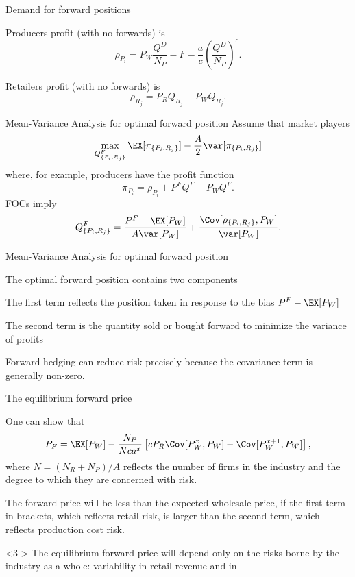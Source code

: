 {Demand for forward positions}






	Producers profit (with no forwards) is
$$
\rho_{P_i}=P_W\frac{Q^D}{N_P}-F-\frac{a}{c}\left(\frac{Q^D}{N_P}\right)^{c}.$$


	Retailers profit (with no forwards) is
$$
\rho_{R_j}=P_RQ_{R_j}-P_WQ_{R_j}.
$$





{Mean-Variance Analysis for optimal forward position}
Assume that market players
$$
\max_{Q^F_{\{P_i,R_j\}}}\EX[\pi_{\{P_i,R_j\}}]-\frac{A}{2}\var[\pi_{\{P_i,R_j\}}]
$$
where, for example, producers have the profit function
$$
\pi_{P_i}=\rho_{P_i}+ P^FQ^F-P_WQ^F.
$$
FOCs imply
$$
Q^F_{\{P_i,R_j\}}= \frac{P^F-\EX[P_W]}{A\var[P_W]}+\frac{\Cov[\rho_{\{P_i,R_j\}},P_W]}{\var[P_W]}.
$$

{Mean-Variance Analysis for optimal forward position}






	The optimal forward position contains two components






	The first term reflects the position taken in response to the bias $P^F-\EX[P_W]$


	The second term is the quantity sold or bought forward to minimize the variance of profits






	Forward hedging can reduce risk precisely because the covariance term is generally non-zero.





{The equilibrium forward price}






	One can show that
$$
P_F=\EX[P_W]-\frac{N_P}{Nca^x}\left[cP_R\Cov[P_W^{x}, P_W]-\Cov[P_W^{x+1}, P_W]\right],
$$
where $N=(N_R+N_P)/A$ reflects the number of firms in the industry and the degree to which they are concerned with risk.


	The forward price will be less than the expected wholesale price, if the first term in brackets, which reflects retail risk, is
larger than the second term, which reflects production cost risk.
%

	<3-> The equilibrium forward price will depend only on the risks borne by the industry as a whole: variability in retail revenue and in %






